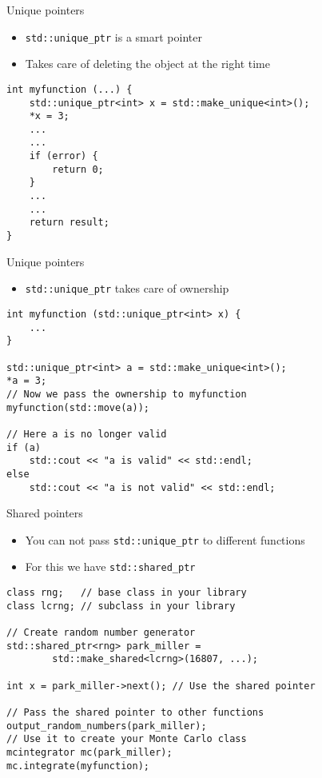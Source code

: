 \documentclass[10pt]{beamer}
\begin{document}
\begin{frame}[fragile,label={sec:orge99600f}]{Unique pointers}
 \begin{itemize}
\item \texttt{std::unique\_ptr} is a \alert{smart pointer}
\item Takes care of deleting the object at the right time
\end{itemize}

\begin{verbatim}
int myfunction (...) {
    std::unique_ptr<int> x = std::make_unique<int>();
    *x = 3;
    ...
    ...
    if (error) {
        return 0;
    }
    ...
    ...
    return result;
}
\end{verbatim}
\end{frame}

\begin{frame}[fragile,label={sec:org706cc18}]{Unique pointers}
 \begin{itemize}
\item \texttt{std::unique\_ptr} takes care of \alert{ownership}
\end{itemize}

\begin{verbatim}
int myfunction (std::unique_ptr<int> x) {
    ...
}

std::unique_ptr<int> a = std::make_unique<int>();
*a = 3;
// Now we pass the ownership to myfunction
myfunction(std::move(a));

// Here a is no longer valid
if (a)
    std::cout << "a is valid" << std::endl;
else
    std::cout << "a is not valid" << std::endl;
\end{verbatim}
\end{frame}

\begin{frame}[fragile,label={sec:org66eb9b9}]{Shared pointers}
 \begin{itemize}
\item You can not pass \texttt{std::unique\_ptr} to different functions
\item For this we have \texttt{std::shared\_ptr}
\end{itemize}

\begin{verbatim}
class rng;   // base class in your library
class lcrng; // subclass in your library

// Create random number generator
std::shared_ptr<rng> park_miller =
        std::make_shared<lcrng>(16807, ...);

int x = park_miller->next(); // Use the shared pointer

// Pass the shared pointer to other functions
output_random_numbers(park_miller);
// Use it to create your Monte Carlo class
mcintegrator mc(park_miller);
mc.integrate(myfunction);
\end{verbatim}
\end{frame}
\end{document}
